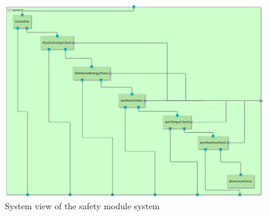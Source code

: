 \documentclass[12pt]{scrreprt}
\begin{document}
\begin{figure}[H]
    \centering
    \includegraphics[width=\textwidth]{Figures/results/modelling_figures/system_view/system_view.png}
    \caption{System view of the safety module system}
    \label{fig:safety_module_system_view}
\end{figure}
\end{document}
